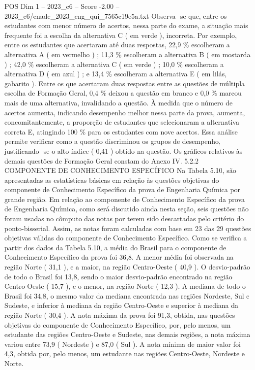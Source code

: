 \begin{textsample}{POS Dim 1 – 2023\_c6 – Score -2.00 – 2023\_c6/enade\_2023\_eng\_qui\_7565c19e5a.txt}
Observa -se que, entre os estudantes com menor número de acertos, nessa parte do exame, a situação mais frequente foi a escolha da alternativa C ( em verde ), incorreta.
Por exemplo, entre os estudantes que acertaram até duas respostas, 22,9 \% escolheram a alternativa A ( em vermelho ) ; 11,3 \% escolheram a alternativa B ( em mostarda ) ; 42,0 \% escolheram a alternativa C ( em verde ) ; 10,0 \% escolheram a alternativa D ( em azul ) ; e 13,4 \% escolheram a alternativa E ( em lilás, gabarito ).
Entre os que acertaram duas respostas entre as questões de múltipla escolha de Formação Geral, 0,4 \% deixou a questão em branco e 0,0 \% marcou mais de uma alternativa, invalidando a questão.
À medida que o número de acertos aumenta, indicando desempenho melhor nessa parte da prova, aumenta, concomitantemente, a proporção de estudantes que selecionaram a alternativa correta E, atingindo 100 \% para os estudantes com nove acertos.
Essa análise permite verificar como a questão discriminou os grupos de desempenho, justificando -se o alto índice ( 0,41 ) obtido na questão.
Os gráficos relativos às demais questões de Formação Geral constam do Anexo IV. 5.2.2 COMPONENTE DE CONHECIMENTO ESPECÍFICO Na Tabela 5.10, são apresentadas as estatísticas básicas em relação às questões objetivas do componente de Conhecimento Específico da prova de Engenharia Química por grande região.
Em relação ao componente de Conhecimento Específico da prova de Engenharia Química, como será discutido ainda nesta seção, seis questões não foram usadas no cômputo das notas por terem sido descartadas pelo critério do ponto-bisserial.
Assim, as notas foram calculadas com base em 23 das 29 questões objetivas válidas do componente de Conhecimento Específico.
Como se verifica a partir dos dados da Tabela 5.10, a média do Brasil para o componente de Conhecimento Específico da prova foi 36,8.
A menor média foi observada na região Norte ( 31,1 ), e a maior, na região Centro-Oeste ( 40,9 ).
O desvio-padrão de todo o Brasil foi 13,8, sendo o maior desvio-padrão encontrado na região Centro-Oeste ( 15,7 ), e o menor, na região Norte ( 12,3 ).
A mediana de todo o Brasil foi 34,8, o mesmo valor da mediana encontrada nas regiões Nordeste, Sul e Sudeste, e inferior à mediana da região Centro-Oeste e superior à mediana da região Norte ( 30,4 ).
A nota máxima da prova foi 91,3, obtida, nas questões objetivas do componente de Conhecimento Específico, por, pelo menos, um estudante das regiões Centro-Oeste e Sudeste, nas demais regiões, a nota máxima variou entre 73,9 ( Nordeste ) e 87,0 ( Sul ).
A nota mínima de maior valor foi 4,3, obtida por, pelo menos, um estudante nas regiões Centro-Oeste, Nordeste e Norte.

\end{textsample}
